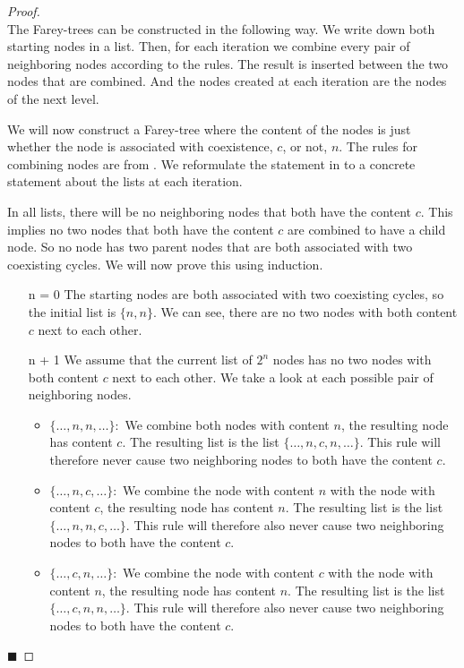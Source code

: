 \begin{proof} \phantom{x} \\
	The Farey-trees can be constructed in the following way.
	We write down both starting nodes in a list.
	Then, for each iteration we combine every pair of neighboring nodes according to the rules.
	The result is inserted between the two nodes that are combined.
	And the nodes created at each iteration are the nodes of the next level.

	We will now construct a Farey-tree where the content of the nodes is just whether the node is associated with coexistence, $c$, or not, $n$.
	The rules for combining nodes are from .
	We reformulate the statement in  to a concrete statement about the lists at each iteration.

	In all lists, there will be no neighboring nodes that both have the content $c$.
	This implies no two nodes that both have the content $c$ are combined to have a child node.
	So no node has two parent nodes that are both associated with two coexisting cycles.
	We will now prove this using induction.

	\begin{itemize}
		\item[n = 0] The starting nodes are both associated with two coexisting cycles, so the initial list is $\{n, n\}$.
			We can see, there are no two nodes with both content $c$ next to each other. \checkmark
		\item[n + 1] We assume that the current list of $2^n$ nodes has no two nodes with both content $c$ next to each other.
			We take a look at each possible pair of neighboring nodes.
			\begin{itemize}
				\item $\{\dots, n, n, \dots\}:$ We combine both nodes with content $n$, the resulting node has content $c$.
				      The resulting list is the list $\{\dots, n, c, n, \dots\}$.
				      This rule will therefore never cause two neighboring nodes to both have the content $c$.
				\item $\{\dots, n, c, \dots\}:$ We combine the node with content $n$ with the node with content $c$, the resulting node has content $n$.
				      The resulting list is the list $\{\dots, n, n, c, \dots\}$.
				      This rule will therefore also never cause two neighboring nodes to both have the content $c$.
				\item $\{\dots, c, n, \dots\}:$ We combine the node with content $c$ with the node with content $n$, the resulting node has content $n$.
				      The resulting list is the list $\{\dots, c, n, n, \dots\}$.
				      This rule will therefore also never cause two neighboring nodes to both have the content $c$.
			\end{itemize}
	\end{itemize}
	\hfill $\blacksquare$
\end{proof}
